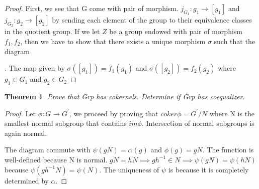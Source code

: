 \documentclass{article}
\theoremstyle{plain}
\newtheorem{theorem}{Theorem}
\theoremstyle{definition}
\begin{document}
\begin{proof}
First, we see that G come with pair of morphism. $j_{G_{1}}: g_{1} \to [g_{1}]$ and $j_{G_{2}}: g_{2} \to [g_{2}]$ by sending each element of the group to their equivalence classes in the quotient group. If we let $Z$ be  a group endowed with pair of morphism $f_{1}, f_{2}$, then we have to show that there exists a unique morphism $\sigma$ such that the diagram . The map given by $\sigma([g_{1}]) = f_{1}(g_{1})$ and $\sigma([g_{2}]) = f_{2}(g_{2})$ where $g_{1} \in G_{1}$ and $g_{2} \in G_{2}$
\end{proof}

\begin{theorem}
Prove that Grp has cokernels. Determine if Grp has coequalizer. 
\end{theorem}

\begin{proof}
	Let $\phi: G \to G^{'}$, we proceed by proving that $coker \phi = G^{'}/N$ where N is the smallest normal subgroup that contains $im \phi$. Intersection of normal subgroups is again normal. 

The diagram commute with $\psi(gN) = \alpha(g)$ and $\phi(g) = gN$. The function is well-defined because N is normal. $gN = hN \implies gh^{-1} \in N \implies \psi(gN) = \psi(hN) $ because $\psi(gh^{-1}N) = \psi(N)$. The uniqueness of $\psi$ is because it is completely determined by $\alpha$.
\end{proof}
\end{document}
